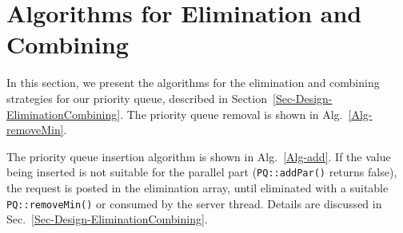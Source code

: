 \section{Algorithms for Elimination and Combining}
\label{App-Algorithms-EliminationCombining}

In this section, we present the algorithms for the elimination and combining strategies for our priority queue, described in Section~\ref{Sec-Design-EliminationCombining}. The priority queue removal is shown in Alg.~\ref{Alg-removeMin}.







% 

The priority queue insertion algorithm is shown in Alg.~\ref{Alg-add}. If the value being inserted is not suitable for the parallel part (\texttt{PQ::addPar()} returns false), the request is posted in the elimination array, until eliminated with a suitable \texttt{PQ::removeMin()} or consumed by the server thread. Details are discussed in Sec.~\ref{Sec-Design-EliminationCombining}. 

